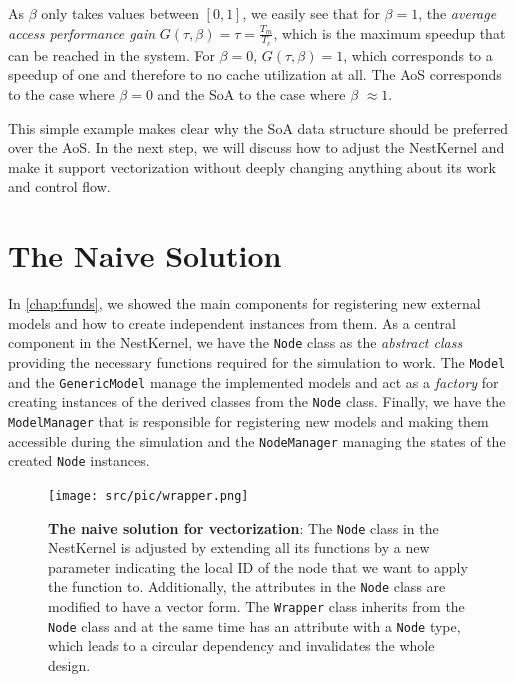 As $\beta$ only takes values between $[0, 1]$, we easily see that for $\beta = 1$, the \emph{average access performance gain} $G(\tau, \beta) = \tau = \frac{T_m}{T_c}$, which is the maximum speedup that can be reached in the system. For $\beta =0$, $G(\tau, \beta) = 1$, which corresponds to a speedup of one and therefore to no cache utilization at all. The AoS corresponds to the case where $\beta = 0$ and the SoA to the case where $\beta$ $\approx 1$.

This simple example makes clear why the SoA data structure should be preferred over the AoS. In the next step, we will discuss how to adjust the NestKernel and make it support vectorization without deeply changing anything about its work and control flow.

\section{The Naive Solution}

In \autoref{chap:funds}, we showed the main components for registering new external models and how to create independent instances from them. As a central component in the NestKernel, we have the \texttt{Node} class as the \emph{abstract class} providing the necessary functions required for the simulation to work. The \texttt{Model} and the \texttt{GenericModel} manage the implemented models and act as a \emph{factory} for creating instances of the derived classes from the \texttt{Node} class. Finally, we have the \texttt{ModelManager} that is responsible for registering new models and making them accessible during the simulation and the \texttt{NodeManager} managing the states of the created \texttt{Node} instances. 

\begin{figure}[h!]
\centering
\texttt{[image: src/pic/wrapper.png]}
\caption{\textbf{The naive solution for vectorization}: The \texttt{Node} class in the NestKernel is adjusted by extending all its functions by a new parameter indicating the local ID of the node that we want to apply the function to. Additionally, the attributes in the \texttt{Node} class are modified to have a vector form. The \texttt{Wrapper} class inherits from the \texttt{Node} class and at the same time has an attribute with a \texttt{Node} type, which leads to a circular dependency and invalidates the whole design.}
\label{fig:naive}
\end{figure}

